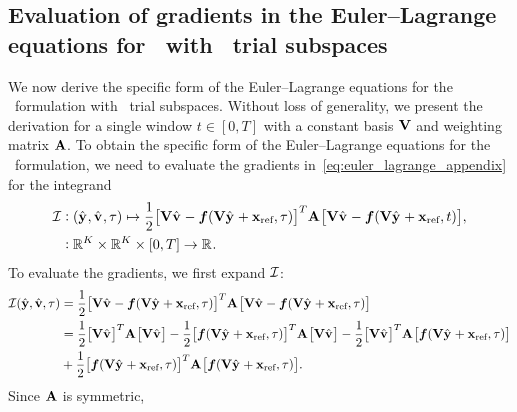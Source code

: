 \documentclass[3p,computermodern,10pt]{elsarticle}
\begin{document}
\begin{appendices}
\section{Evaluation of gradients in the Euler--Lagrange equations for \methodAcronym\ with \spatialAcronym\ trial subspaces}\label{appendix:vector_calc}
We now derive the specific form of the Euler--Lagrange equations for the \methodAcronym\ formulation with \spatialAcronym\ trial subspaces. Without loss of generality, we present the derivation for a single window $t \in [0,T]$ with a constant basis $\mathbf {V}$ and weighting matrix $\mathbf{A}$.  
To obtain the specific form of the Euler--Lagrange equations for the \methodAcronym\ formulation, we need to evaluate the gradients in~\eqref{eq:euler_lagrange_appendix} for the integrand
\begin{align*}\label{eq:integrand_apx}
 \mathcal{I} & \vcentcolon
(\hat{\mathbf{y}}^{}, \hat{\mathbf{v}}^{} ,\tau) \mapsto \frac{1}{2} \big[
\mathbf {V} \hat{\mathbf{v}}^{} - \boldsymbol f(\mathbf {V} \hat{\mathbf{y}}^{}
+ \mathbf{x}_\text{ref},\tau) \big]^T \mathbf{A}^{} \big[
\mathbf {V} \hat{\mathbf{v}}^{}  - \boldsymbol f(\mathbf {V} \hat{\mathbf{y}}^{} +
\mathbf{x}_\text{ref},t) \big], \\ & 
\vcentcolon \mathbb{R}^{K} \times \mathbb{R}^{K} \times [0,T]
 \rightarrow \mathbb{R}^{} .  
\end{align*}
To evaluate the gradients, we first expand $\mathcal{I}$:
\begin{align*}
 \mathcal{I}(\hat{\mathbf{y}},\hat{\mathbf{v}},\tau)  &= \frac{1}{2} \big[ \mathbf {V} \hat{\mathbf{v}}^{}  - \boldsymbol f(\mathbf {V} \hat{\mathbf{y}}^{} + \mathbf{x}_\text{ref},\tau) \big]^T \mathbf{A}^{} \big[ \mathbf {V} \hat{\mathbf{v}}^{} - \boldsymbol f(\mathbf {V} \hat{\mathbf{y}}^{} + \mathbf{x}_\text{ref},\tau) \big] \\ 
 &= \frac{1}{2}\big[\mathbf {V} \hat{\mathbf{v}}^{}  \big]^T  \mathbf{A}^{}  \big[\mathbf {V} \hat{\mathbf{v}}^{} \big]  - \frac{1}{2}\big[ \boldsymbol f(\mathbf {V} \hat{\mathbf{y}}^{} + \mathbf{x}_\text{ref},\tau) \big]^T \mathbf{A}^{}  \big[\mathbf {V} \hat{\mathbf{v}}^{}\big] - \frac{1}{2} \big[ \mathbf {V} \hat{\mathbf{v}}^{} \big]^T \mathbf{A}^{} \big[ \boldsymbol f(\mathbf {V} \hat{\mathbf{y}}^{} + \mathbf{x}_\text{ref},\tau) \big]  \\ &+ \frac{1}{2}\big[\boldsymbol f(\mathbf {V} \hat{\mathbf{y}}^{} + \mathbf{x}_\text{ref},\tau) \big]^T \mathbf{A}^{} \big[ \boldsymbol f(\mathbf {V} \hat{\mathbf{y}}^{} + \mathbf{x}_\text{ref},\tau) \big].
\end{align*}
Since $\mathbf{A}$ is symmetric,
\begin{equation}\label{eq:int_expand}

\end{equation}
\end{appendices}
\end{document}
